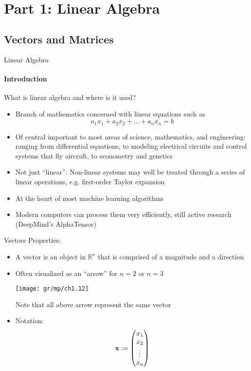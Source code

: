 \section{Part 1: Linear Algebra}

\subsection{Vectors and Matrices}

\begin{frame}{Linear Algebra}
    \framesubtitle{Introduction}
    What is linear algebra and where is it used?
    \begin{itemize}
        \item Branch of mathematics concerned with linear equations such as
              $$a_1 x_1 + a_2 x_2 + \dots + a_n x_n = b$$
        \item Of central important to most areas of science, mathematics, and engineering: ranging from differential equations, to modeling electrical circuits and control systems that fly aircraft, to econometry and genetics
        \item Not just ``linear'': Non-linear systems may well be treated through a series of linear operations, e.g. first-order Taylor expansion
        \item At the heart of most machine learning algorithms
        \item Modern computers can process them very efficiently, still active research (DeepMind's AlphaTensor)
    \end{itemize}
\end{frame}

\begin{frame}{Vectors}
    Properties:
    \begin{itemize}
        \item A vector is an object in $\mathbb{R}^n$ that is comprised of a magnitude and a direction
        \item Often visualized as an ``arrow'' for $n=2$ or $n=3$\\
              \begin{center}
                  \texttt{[image: gr/mp/ch1.12]}
              \end{center}
              Note that all above arrow represent the same vector
        \item Notation: $$\vb{x} := \mqty(x_1 \\ x_2 \\ \vdots \\ x_n)$$
    \end{itemize}
\end{frame}


